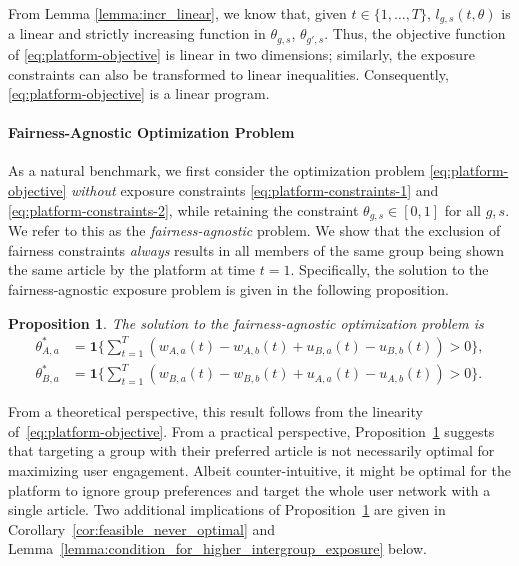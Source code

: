 \documentclass[letterpaper]{article} %
\newtheorem{proposition}{Proposition}
\begin{document}
From Lemma \ref{lemma:incr_linear}, we know that, given $t \in \{1,\dots,T\}$, $l_{g,s}(t,\theta)$ is a linear and strictly increasing function in $\theta_{g,s}$, $\theta_{g',s}$.
Thus, the objective function of \eqref{eq:platform-objective} is  linear in two dimensions; similarly, the exposure constraints can also be transformed to linear inequalities.
Consequently, \eqref{eq:platform-objective} is a linear program.

\paragraph{Fairness-Agnostic Optimization Problem}
As a natural benchmark, we first consider the optimization problem \eqref{eq:platform-objective} \textit{without} exposure constraints \eqref{eq:platform-constraints-1} and \eqref{eq:platform-constraints-2}, while retaining the constraint $\theta_{g,s} \in [0,1]$ for all $g,s$.
We refer to this as the \emph{fairness-agnostic} problem.
We show that the exclusion of fairness constraints \emph{always} results in all members of the same group being shown the same article by the platform  at time $t=1$.
Specifically, the solution to the fairness-agnostic exposure problem is given in the following proposition.

\begin{proposition}
\label{prop:unconstrained_optimization}
The solution to the fairness-agnostic optimization problem is
\footnotesize
\begin{align*}
    \theta_{A,a}^* &=  \mathbf{1} \Big\{ \sum_{t=1}^T \left(w_{A,a}(t) - w_{A,b}(t) + u_{B,a}(t) - u_{B,b}(t)\right) > 0 \Big\}, \\
    \theta_{B,a}^* &=  \mathbf{1} \Big\{\sum_{t=1}^T \left( w_{B,a}(t) - w_{B,b}(t) + u_{A,a}(t) - u_{A,b}(t)\right) > 0 \Big\}.
\end{align*}
\normalsize
\end{proposition}
From a theoretical perspective, this result follows from the linearity of~\eqref{eq:platform-objective}.
From a practical perspective, Proposition~\ref{prop:unconstrained_optimization} suggests that targeting a group with their preferred article is not necessarily optimal for maximizing user engagement.
Albeit counter-intuitive, it might be optimal for the platform to ignore group preferences and target the whole user network with a single article.
Two additional implications of Proposition~\ref{prop:unconstrained_optimization} are given in Corollary~\ref{cor:feasible_never_optimal} and Lemma~\ref{lemma:condition_for_higher_intergroup_exposure} below.
\end{document}
